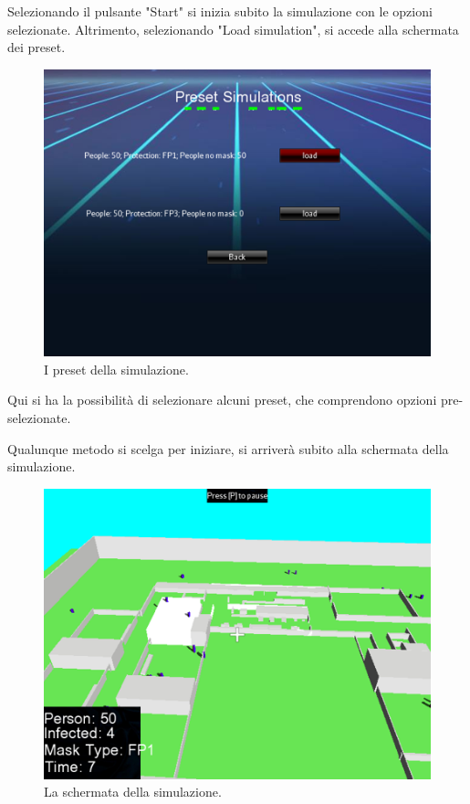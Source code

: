 \documentclass[a4paper,12pt]{report}
\begin{document}
Selezionando il pulsante "Start" si inizia subito la simulazione con le opzioni selezionate. Altrimento, selezionando "Load simulation", si accede alla schermata dei preset.

\begin{figure}[h]
\centering{}
\includegraphics{2.png} 
\caption{I preset della simulazione.}
\label{img:preset}
\end{figure}

Qui si ha la possibilità di selezionare alcuni preset, che comprendono opzioni pre-selezionate.

Qualunque metodo si scelga per iniziare, si arriverà subito alla schermata della simulazione.

\newpage

\begin{figure}[h]
\centering{}
\includegraphics{3.png} 
\caption{La schermata della simulazione.}
\label{img:scene}
\end{figure}
\end{document}
